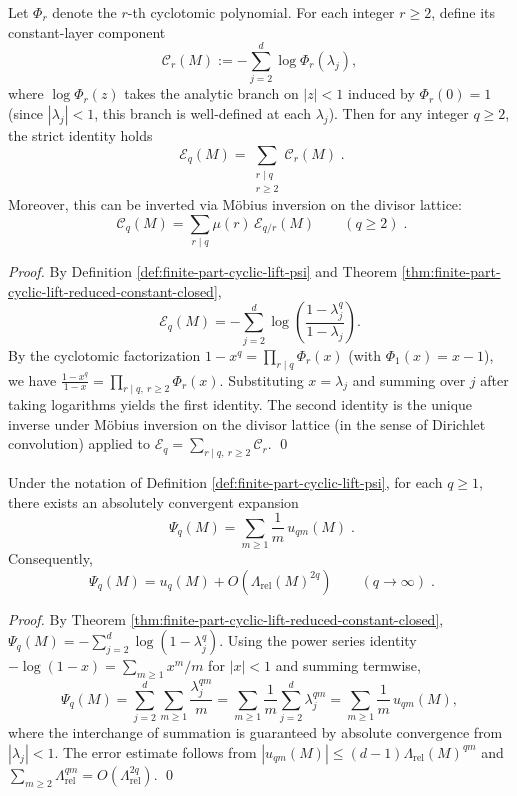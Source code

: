 \begin{proposition}\label{prop:finite-part-cyclic-lift-cyclotomic-divisor-mobius}
Let \(\Phi_r\) denote the \(r\)-th cyclotomic polynomial.
For each integer \(r\ge 2\), define its constant-layer component
\[
\mathcal{C}_r(M):=-\sum_{j=2}^{d}\log \Phi_r(\lambda_j),
\]
where \(\log\Phi_r(z)\) takes the analytic branch on \(|z|<1\) induced by \(\Phi_r(0)=1\) (since \(|\lambda_j|<1\), this branch is well-defined at each \(\lambda_j\)).
Then for any integer \(q\ge 2\), the strict identity holds
\[
\boxed{\;
\mathcal{E}_q(M)=\sum_{\substack{r\mid q\\ r\ge 2}}\mathcal{C}_r(M)\; }.
\]
Moreover, this can be inverted via Möbius inversion on the divisor lattice:
\[
\boxed{\;
\mathcal{C}_q(M)=\sum_{r\mid q}\mu(r)\,\mathcal{E}_{q/r}(M)\qquad(q\ge 2)\; }.
\]
\end{proposition}
\begin{proof}
By Definition \ref{def:finite-part-cyclic-lift-psi} and Theorem \ref{thm:finite-part-cyclic-lift-reduced-constant-closed},
\[
\mathcal{E}_q(M)
=-\sum_{j=2}^{d}\log\!\left(\frac{1-\lambda_j^{q}}{1-\lambda_j}\right).
\]
By the cyclotomic factorization \(1-x^{q}=\prod_{r\mid q}\Phi_r(x)\) (with \(\Phi_1(x)=x-1\)), we have
\(
\frac{1-x^{q}}{1-x}=\prod_{r\mid q,\ r\ge 2}\Phi_r(x)
\).
Substituting \(x=\lambda_j\) and summing over \(j\) after taking logarithms yields the first identity.
The second identity is the unique inverse under Möbius inversion on the divisor lattice (in the sense of Dirichlet convolution) applied to \(\mathcal{E}_q=\sum_{r\mid q,\ r\ge 2}\mathcal{C}_r\). \qed
\end{proof}

\begin{proposition}\label{prop:finite-part-cyclic-lift-dirichlet-multiple-sum}
Under the notation of Definition \ref{def:finite-part-cyclic-lift-psi}, for each \(q\ge 1\), there exists an absolutely convergent expansion
\[
\boxed{\;
\Psi_q(M)=\sum_{m\ge 1}\frac{1}{m}\,u_{qm}(M)\; }.
\]
Consequently,
\[
\boxed{\;
\Psi_q(M)=u_q(M)+O\!\left(\Lambda_{\mathrm{rel}}(M)^{2q}\right)\qquad(q\to\infty)\; }.
\]
\end{proposition}
\begin{proof}
By Theorem \ref{thm:finite-part-cyclic-lift-reduced-constant-closed},
\(
\Psi_q(M)=-\sum_{j=2}^{d}\log(1-\lambda_j^q)
\).
Using the power series identity \(-\log(1-x)=\sum_{m\ge 1}x^m/m\) for \(|x|<1\) and summing termwise,
\[
\Psi_q(M)=\sum_{j=2}^{d}\sum_{m\ge 1}\frac{\lambda_j^{qm}}{m}
=\sum_{m\ge 1}\frac{1}{m}\sum_{j=2}^{d}\lambda_j^{qm}
=\sum_{m\ge 1}\frac{1}{m}\,u_{qm}(M),
\]
where the interchange of summation is guaranteed by absolute convergence from \(|\lambda_j|<1\).
The error estimate follows from
\(
|u_{qm}(M)|\le (d-1)\Lambda_{\mathrm{rel}}(M)^{qm}
\)
and
\(
\sum_{m\ge 2}\Lambda_{\mathrm{rel}}^{qm}=O(\Lambda_{\mathrm{rel}}^{2q})
\).
\qed
\end{proof}

